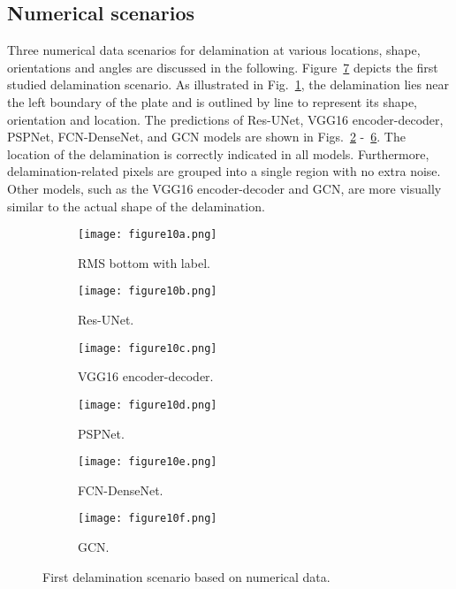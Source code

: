 \subsection{Numerical scenarios}
Three numerical data scenarios for delamination at various locations, shape, orientations and angles are discussed in the following.
Figure~\ref{fig:softmax_448} depicts the first studied delamination scenario.
As illustrated in Fig.~\ref{fig:RMS_flat_shell_Vz_448}, the delamination lies near the left boundary of the plate and is outlined by line to represent its shape, orientation and location.
The predictions of Res-UNet, VGG16 encoder-decoder, PSPNet, FCN-DenseNet, and GCN models are shown in Figs.~\ref{fig:unet_pred_448} -~\ref{fig:gcn_pred_448}.
The location of the delamination is correctly indicated in all models.
Furthermore, delamination-related pixels are grouped into a single region with no extra noise.
Other models, such as the VGG16 encoder-decoder and GCN, are more visually similar to the actual shape of the delamination.
\begin{figure}[!h]
	\centering
	\begin{subfigure}[b]{0.47\textwidth}
		\centering
		\texttt{[image: figure10a.png]}
		\caption{RMS bottom with label.}
		\label{fig:RMS_flat_shell_Vz_448}
	\end{subfigure}
	\hfill
	\begin{subfigure}[b]{0.47\textwidth}
		\centering
		\texttt{[image: figure10b.png]}
		\caption{Res-UNet.}
		\label{fig:unet_pred_448}
	\end{subfigure}
	\hfill
	\begin{subfigure}[b]{0.47\textwidth}
		\centering
		\texttt{[image: figure10c.png]}
		\caption{VGG16 encoder-decoder.}
		\label{fig:vgg16_pred_448}
	\end{subfigure}
	\hfill
	\begin{subfigure}[b]{0.47\textwidth}
		\centering
		\texttt{[image: figure10d.png]}
		\caption{PSPNet.}
		\label{fig:pspnet_pred_448}
	\end{subfigure}
	\hfill
	\begin{subfigure}[b]{0.47\textwidth}
		\centering
		\texttt{[image: figure10e.png]}
		\caption{FCN-DenseNet.}
		\label{fig:fcn_densenet_pred_448}
	\end{subfigure}
	\hfill
	\begin{subfigure}[b]{0.47\textwidth}
		\centering
		\texttt{[image: figure10f.png]}
		\caption{GCN.}
		\label{fig:gcn_pred_448}
	\end{subfigure}
	\caption{First delamination scenario based on numerical data.}
	\label{fig:softmax_448}
\end{figure} 
\clearpage

